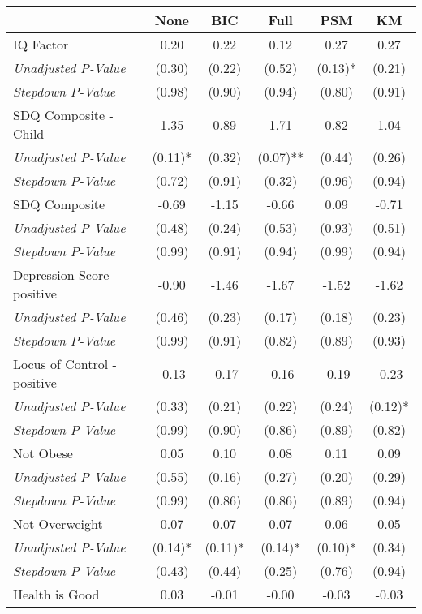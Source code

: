 \begin{tabular}{l c c c c c}
\toprule
 & None & BIC & Full & PSM & KM \\
\midrule
IQ Factor & 0.20 & 0.22 & 0.12 & 0.27 & 0.27 \\
\quad \textit{Unadjusted P-Value} & (0.30) & (0.22) & (0.52) & (0.13)* & (0.21) \\
\quad \textit{Stepdown P-Value} & (0.98) & (0.90) & (0.94) & (0.80) & (0.91) \\
SDQ Composite - Child & 1.35 & 0.89 & 1.71 & 0.82 & 1.04 \\
\quad \textit{Unadjusted P-Value} & (0.11)* & (0.32) & (0.07)** & (0.44) & (0.26) \\
\quad \textit{Stepdown P-Value} & (0.72) & (0.91) & (0.32) & (0.96) & (0.94) \\
SDQ Composite & -0.69 & -1.15 & -0.66 & 0.09 & -0.71 \\
\quad \textit{Unadjusted P-Value} & (0.48) & (0.24) & (0.53) & (0.93) & (0.51) \\
\quad \textit{Stepdown P-Value} & (0.99) & (0.91) & (0.94) & (0.99) & (0.94) \\
Depression Score - positive & -0.90 & -1.46 & -1.67 & -1.52 & -1.62 \\
\quad \textit{Unadjusted P-Value} & (0.46) & (0.23) & (0.17) & (0.18) & (0.23) \\
\quad \textit{Stepdown P-Value} & (0.99) & (0.91) & (0.82) & (0.89) & (0.93) \\
Locus of Control - positive & -0.13 & -0.17 & -0.16 & -0.19 & -0.23 \\
\quad \textit{Unadjusted P-Value} & (0.33) & (0.21) & (0.22) & (0.24) & (0.12)* \\
\quad \textit{Stepdown P-Value} & (0.99) & (0.90) & (0.86) & (0.89) & (0.82) \\
Not Obese & 0.05 & 0.10 & 0.08 & 0.11 & 0.09 \\
\quad \textit{Unadjusted P-Value} & (0.55) & (0.16) & (0.27) & (0.20) & (0.29) \\
\quad \textit{Stepdown P-Value} & (0.99) & (0.86) & (0.86) & (0.89) & (0.94) \\
Not Overweight & 0.07 & 0.07 & 0.07 & 0.06 & 0.05 \\
\quad \textit{Unadjusted P-Value} & (0.14)* & (0.11)* & (0.14)* & (0.10)* & (0.34) \\
\quad \textit{Stepdown P-Value} & (0.43) & (0.44) & (0.25) & (0.76) & (0.94) \\
Health is Good & 0.03 & -0.01 & -0.00 & -0.03 & -0.03 \\

\end{tabular}
